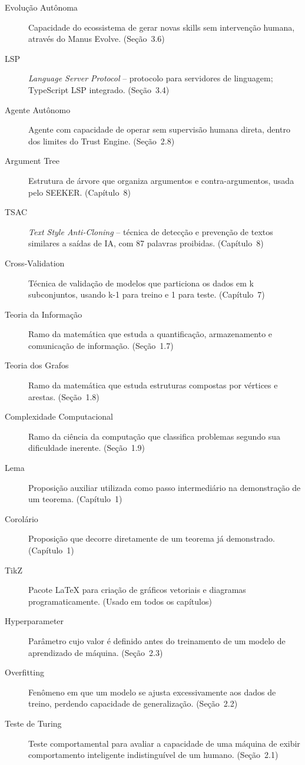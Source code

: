 \begin{description}
\item[Evolução Autônoma] Capacidade do ecossistema de gerar novas skills
sem intervenção humana, através do Manus Evolve. (Seção~3.6)

\item[LSP] \emph{Language Server Protocol} -- protocolo para servidores
de linguagem; TypeScript LSP integrado. (Seção~3.4)

\item[Agente Autônomo] Agente com capacidade de operar sem supervisão
humana direta, dentro dos limites do Trust Engine. (Seção~2.8)

\item[Argument Tree] Estrutura de árvore que organiza argumentos e
contra-argumentos, usada pelo SEEKER. (Capítulo~8)

\item[TSAC] \emph{Text Style Anti-Cloning} -- técnica de detecção e
prevenção de textos similares a saídas de IA, com 87 palavras
proibidas. (Capítulo~8)

\item[Cross-Validation] Técnica de validação de modelos que particiona
os dados em k subconjuntos, usando k-1 para treino e 1 para teste.
(Capítulo~7)

\item[Teoria da Informação] Ramo da matemática que estuda a quantificação,
armazenamento e comunicação de informação. (Seção~1.7)

\item[Teoria dos Grafos] Ramo da matemática que estuda estruturas
compostas por vértices e arestas. (Seção~1.8)

\item[Complexidade Computacional] Ramo da ciência da computação que
classifica problemas segundo sua dificuldade inerente. (Seção~1.9)

\item[Lema] Proposição auxiliar utilizada como passo intermediário na
demonstração de um teorema. (Capítulo~1)

\item[Corolário] Proposição que decorre diretamente de um teorema já
demonstrado. (Capítulo~1)

\item[TikZ] Pacote LaTeX para criação de gráficos vetoriais e diagramas
programaticamente. (Usado em todos os capítulos)

\item[Hyperparameter] Parâmetro cujo valor é definido antes do
treinamento de um modelo de aprendizado de máquina. (Seção~2.3)

\item[Overfitting] Fenômeno em que um modelo se ajusta excessivamente
aos dados de treino, perdendo capacidade de generalização.
(Seção~2.2)

\item[Teste de Turing] Teste comportamental para avaliar a capacidade
de uma máquina de exibir comportamento inteligente indistinguível
de um humano. (Seção~2.1)

\end{description}

